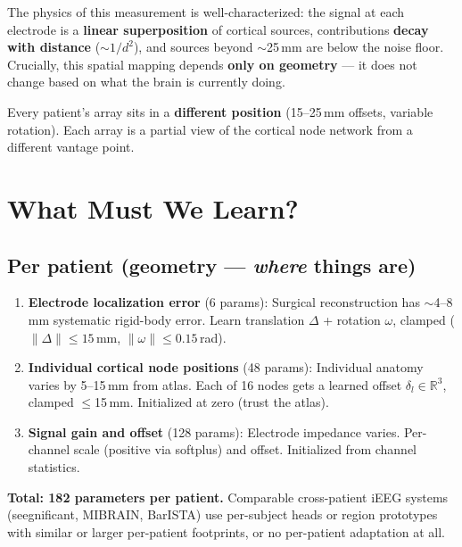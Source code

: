 \documentclass[11pt,letterpaper]{article}
\begin{document}
The physics of this measurement is well-characterized: the signal at each electrode is a \textbf{linear superposition} of cortical sources, contributions \textbf{decay with distance} (${\sim}1/d^2$), and sources beyond ${\sim}$25\,mm are below the noise floor. Crucially, this spatial mapping depends \textbf{only on geometry} --- it does not change based on what the brain is currently doing.

Every patient's array sits in a \textbf{different position} (15--25\,mm offsets, variable rotation). Each array is a partial view of the cortical node network from a different vantage point.


\section{What Must We Learn?}

\subsection*{Per patient (geometry --- \textit{where} things are)}

\begin{enumerate}[leftmargin=2em, itemsep=0.2em]
\item \textbf{Electrode localization error} (6 params): Surgical reconstruction has ${\sim}$4--8\,mm systematic rigid-body error. Learn translation $\Delta$ + rotation $\omega$, clamped ($\|\Delta\| \leq 15$\,mm, $\|\omega\| \leq 0.15$\,rad).

\item \textbf{Individual cortical node positions} (48 params): Individual anatomy varies by 5--15\,mm from atlas. Each of 16 nodes gets a learned offset $\delta_l \in \mathbb{R}^3$, clamped $\leq$15\,mm. Initialized at zero (trust the atlas).

\item \textbf{Signal gain and offset} (128 params): Electrode impedance varies. Per-channel scale (positive via softplus) and offset. Initialized from channel statistics.
\end{enumerate}

\textbf{Total: 182 parameters per patient.} Comparable cross-patient iEEG systems (seegnificant, MIBRAIN, BarISTA) use per-subject heads or region prototypes with similar or larger per-patient footprints, or no per-patient adaptation at all.
\end{document}
